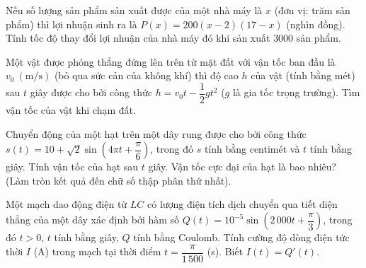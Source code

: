 \begin{bt}%
	Nếu số lượng sản phẩm sản xuất được của một nhà máy là $x$ (đơn vị: trăm sản phẩm) thì lợi nhuận sinh ra là $P(x)=200\left(x-2\right)\left(17-x\right)$ (nghìn đồng). Tính tốc độ thay đổi lợi nhuận của nhà máy đó khi sản xuất $3000$ sản phẩm.
\end{bt}

	\begin{bt}%
	Một vật được phóng thẳng đứng lên trên từ mặt đất với vận tốc ban đầu là $v_0~(\mathrm{m} / \mathrm{s})$ (bỏ qua sức cản của không khí) thì độ cao $h$ của vật (tính bằng mét) sau $t$ giây được cho bởi công thức $h=v_0 t-\dfrac{1}{2} g t^2$ ($g$ là gia tốc trọng trường). Tìm vận tốc của vật khi chạm đất.
\end{bt}

\begin{bt}%
	Chuyển động của một hạt trên một dây rung được cho bởi công thức $s(t)=10+\sqrt{2} \sin \left(4 \pi t+\dfrac{\pi}{6}\right)$, trong đó $s$ tính bằng centimét và $t$ tính bằng giây. Tính vận tốc của hạt sau $t$ giây. Vận tốc cực đại của hạt là bao nhiêu? (Làm tròn kết quả đến chữ số thập phân thứ nhất).
\end{bt}

\begin{bt}%
	Một mạch dao động điện từ $LC$ có lượng điện tích dịch chuyển qua tiết diện thẳng của một dây xác định bởi hàm số $Q(t)=10^{-5}\sin \left(2\,000t+\dfrac{\pi}{3}\right)$, trong đó $t>0$, $t$ tính bằng giây, $Q$ tính bằng Coulomb. Tính cường độ dòng điện tức thời $I$ (A) trong mạch tại thời điểm $t=\dfrac{\pi}{1\,500}$ (s). Biết $I(t)=Q'(t)$.
\end{bt}

